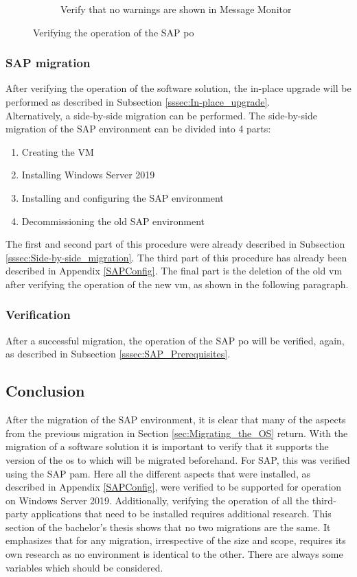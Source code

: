 \begin{figure}[h]
\begin{subfigure}{0.5\textwidth}
        \centering
        \caption{Verify that no warnings are shown in Message Monitor}
    \end{subfigure}
    \caption[Prerequisites of the in-place upgrade]{Verifying the operation of the SAP \acrshort{po}}
    \label{fig:SAPPreInPlace}	
\end{figure}

\subsubsection{SAP migration}
After verifying the operation of the software solution, the in-place upgrade will be performed as described in Subsection \ref{sssec:In-place_upgrade}.\\
Alternatively, a side-by-side migration can be performed. 
The side-by-side migration of the SAP environment can be divided into 4 parts:
\begin{enumerate}
    \item Creating the VM
    \item Installing Windows Server 2019
    \item Installing and configuring the SAP environment
    \item Decommissioning the old SAP environment
\end{enumerate}
The first and second part of this procedure were already described in Subsection \ref{sssec:Side-by-side_migration}.
The third part of this procedure has already been described in Appendix \ref{SAPConfig}. 
The final part is the deletion of the old \acrshort{vm} after verifying the operation of the new \acrshort{vm}, as shown in the following paragraph.

\subsubsection{Verification}
After a successful migration, the operation of the SAP \acrshort{po} will be verified, again, as described in Subsection \ref{sssec:SAP_Prerequisites}.

\subsection{Conclusion}
After the migration of the SAP environment, it is clear that many of the aspects from the previous migration in Section \ref{sec:Migrating_the_OS} return. 
With the migration of a software solution it is important to verify that it supports the version of the \acrshort{os} to which will be migrated beforehand. 
For SAP, this was verified using the SAP \acrshort{pam}.
Here all the different aspects that were installed, as described in Appendix \ref{SAPConfig}, were verified to be supported for operation on Windows Server 2019. 
Additionally, verifying the operation of all the third-party applications that need to be installed requires additional research. 
This section of the bachelor's thesis shows that no two migrations are the same. 
It emphasizes that for any migration, irrespective of the size and scope, requires its own research as no environment is identical to the other. 
There are always some variables which should be considered.  
\clearpage

